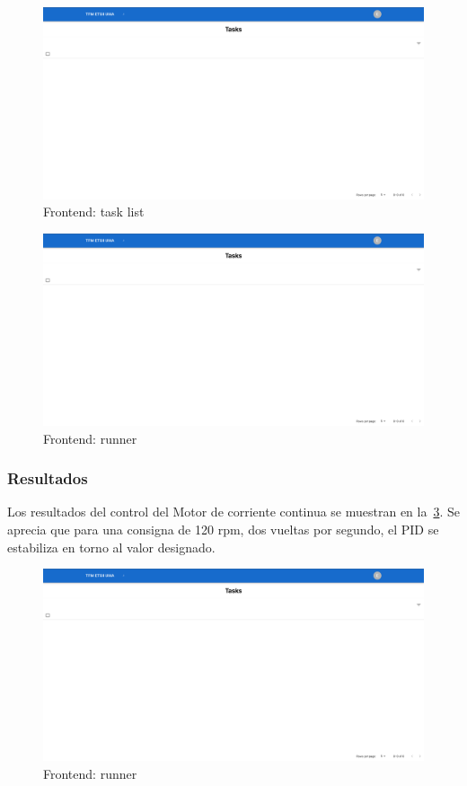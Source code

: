\begin{figure}[H]
    \centering
    \includegraphics[height=0.2\textheight]{./part/Ejecucion/Seguimiento/PuestaAPunto/img/frontend}
    \caption{Frontend: task list}\label{fig:frontend}
\end{figure}

\begin{figure}[H]
    \centering
    \includegraphics[height=0.2\textheight]{./part/Ejecucion/Seguimiento/PuestaAPunto/img/runner}
    \caption{Frontend: runner}\label{fig:runner}
\end{figure}

\subsubsection{Resultados}

Los resultados del control del Motor de corriente continua se muestran en la~\cref{fig:runner2}.
Se aprecia que para una consigna de 120 rpm, dos vueltas por segundo, el PID se estabiliza en torno al valor designado.

\begin{figure}[H]
    \centering
    \includegraphics[height=0.2\textheight]{./part/Ejecucion/Seguimiento/PuestaAPunto/img/runner}
    \caption{Frontend: runner}\label{fig:runner2}
\end{figure}